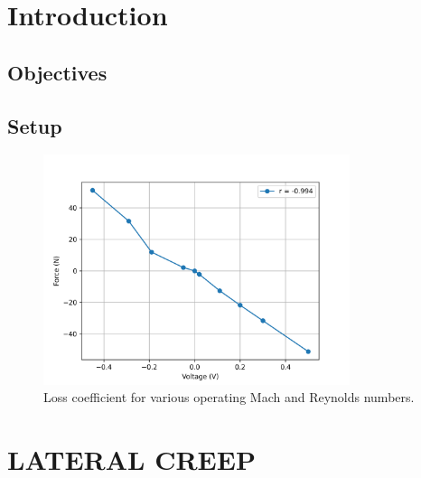\documentclass{article}
\begin{document}
\title{}
\author{lwp26}
\date{November 2024}
\maketitle 

\section{Introduction}

\subsection{Objectives}

\subsection{Setup}

\begin{figure}[H]
    \centering
    \includegraphics[width=0.8\textwidth]{Calibration/linearity.png}
    \caption{Loss coefficient for various operating Mach and Reynolds numbers.}
    \label{fig:force_linearity}
\end{figure}

\section{LATERAL CREEP}
\end{document}

